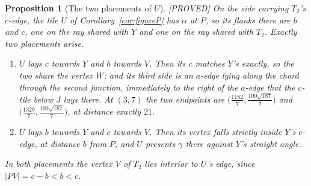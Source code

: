 \documentclass[11pt,reqno]{amsart}
\theoremstyle{plain}
\newtheorem{proposition}[theorem]{Proposition}
\theoremstyle{definition}
\newcommand{\lab}[1]{\hfill\textnormal{\footnotesize\textsc{[#1]}}}
\begin{document}
\begin{proposition}[The two placements of $U$]\label{prop:Uplacements}\lab{PROVED}
On the side carrying $T_2$'s $c$-edge, the tile $U$ of Corollary~\ref{cor:figureP} has $\alpha$ at $P$,
so its flanks there are $b$ and $c$, one on the ray shared with $Y$ and one on the ray shared with
$T_2$. Exactly two placements arise.
\begin{enumerate}
\item[\textup{(i)}] $U$ lays $c$ towards $Y$ and $b$ towards $V$. Then its $c$ matches $Y$'s exactly,
so the two share the vertex $W$; and its third side is an $a$-edge lying \emph{along the chord through
the second junction}, immediately to the right of the $a$-edge that the $c$-tile below $J$ lays there.
At $(3,7)$ the two endpoints are $\bigl(\tfrac{1182}{7},\tfrac{100\sqrt{187}}{7}\bigr)$ and
$\bigl(\tfrac{1329}{7},\tfrac{100\sqrt{187}}{7}\bigr)$, at distance exactly $21$.
\item[\textup{(ii)}] $U$ lays $b$ towards $Y$ and $c$ towards $V$. Then its vertex falls strictly
inside $Y$'s $c$-edge, at distance $b$ from $P$, and $U$ presents $\gamma$ there against $Y$'s straight
angle.
\end{enumerate}
In both placements the vertex $V$ of $T_2$ lies interior to $U$'s edge, since $|PV|=c-b<b<c$.
\end{proposition}
\end{document}
